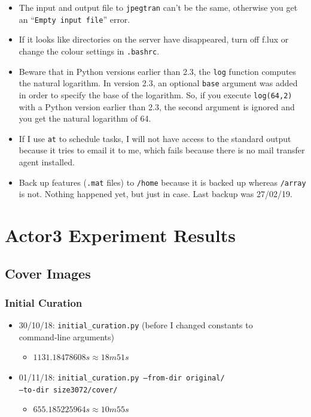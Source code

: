 \documentclass[11pt,a4paper]{report}
\begin{document}
\begin{itemize}

\item The input and output file to \texttt{jpegtran} can't be the same, otherwise you get an ``\texttt{Empty input file}'' error.

\item If it looks like directories on the server have disappeared, turn off f.lux or change the colour settings in \texttt{.bashrc}.

\item Beware that in Python versions earlier than 2.3, the \texttt{log} function computes the natural logarithm. In version 2.3, an optional \texttt{base} argument was added in order to specify the base of the logarithm. So, if you execute \texttt{log(64,2)} with a Python version earlier than 2.3, the second argument is ignored and you get the natural logarithm of 64.

\item If I use \texttt{at} to schedule tasks, I will not have access to the standard output because it tries to email it to me, which fails because there is no mail transfer agent installed.

\item Back up features (\texttt{.mat} files) to \texttt{/home} because it is backed up whereas \texttt{/array} is not. Nothing happened yet, but just in case. Last backup was 27/02/19.

\end{itemize}


\chapter{Actor3 Experiment Results}
\label{sec:actor3-results}

\section{Cover Images}

\subsection{Initial Curation}
\begin{itemize}
\item 30/10/18: \texttt{initial\_curation.py} (before I changed constants to \\
         command-line arguments)
  \begin{itemize}
  \item $1131.18478608s \approx 18m51s$
  \end{itemize}

\item 01/11/18: \texttt{initial\_curation.py --from-dir original/} \\ \texttt{--to-dir size3072/cover/}
  \begin{itemize}
  \item $655.185225964s \approx 10m55s$
  \end{itemize}
\end{itemize}
\end{document}
